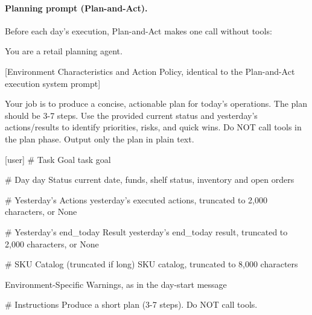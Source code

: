 \paragraph{Planning prompt (Plan-and-Act).}
Before each day's execution, Plan-and-Act makes one call without tools:
\begin{PromptBox}
[system]
You are a retail planning agent.

[Environment Characteristics and Action Policy, identical to the Plan-and-Act execution system prompt]

Your job is to produce a concise, actionable plan for today's operations. The plan should be 3-7 steps.
Use the provided current status and yesterday's actions/results to identify priorities, risks, and quick wins.
Do NOT call tools in the plan phase. Output only the plan in plain text.

[user]
# Task Goal
{task goal}

# Day {day} Status
{current date, funds, shelf status, inventory and open orders}

# Yesterday's Actions
{yesterday's executed actions, truncated to 2,000 characters, or None}

# Yesterday's end_today Result
{yesterday's end_today result, truncated to 2,000 characters, or None}

# SKU Catalog (truncated if long)
{SKU catalog, truncated to 8,000 characters}

{Environment-Specific Warnings, as in the day-start message}

# Instructions
Produce a short plan (3-7 steps). Do NOT call tools.
\end{PromptBox}

